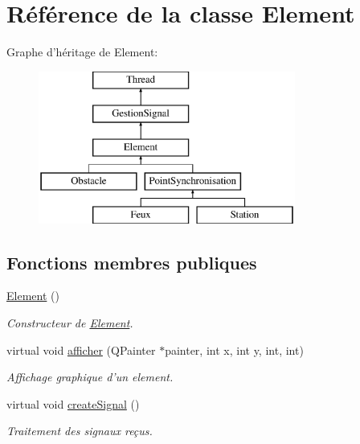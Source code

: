 \hypertarget{classElement}{
\section{Référence de la classe Element}
\label{classElement}
}
Graphe d'héritage de Element:\begin{figure}[H]
\begin{center}
\leavevmode
\includegraphics[height=5cm]{classElement}
\end{center}
\end{figure}
\subsection*{Fonctions membres publiques}
\begin{DoxyCompactItemize}
\item 
\hypertarget{classElement_ab0d0e20be9a36ae676202db753faeec9}{
\hyperlink{classElement_ab0d0e20be9a36ae676202db753faeec9}{Element} ()}
\label{classElement_ab0d0e20be9a36ae676202db753faeec9}

\begin{DoxyCompactList}\small\item\em Constructeur de \hyperlink{classElement}{Element}. \item\end{DoxyCompactList}\item 
virtual void \hyperlink{classElement_aabcc968ccfa004f84bddda789441368b}{afficher} (QPainter $\ast$painter, int x, int y, int, int)
\begin{DoxyCompactList}\small\item\em Affichage graphique d'un element. \item\end{DoxyCompactList}\item 
\hypertarget{classElement_a4f4cc97e3122305ec6f4a8953aba23d5}{
virtual void \hyperlink{classElement_a4f4cc97e3122305ec6f4a8953aba23d5}{createSignal} ()}
\label{classElement_a4f4cc97e3122305ec6f4a8953aba23d5}

\begin{DoxyCompactList}\small\item\em Traitement des signaux reçus. \item\end{DoxyCompactList}\end{DoxyCompactItemize}


